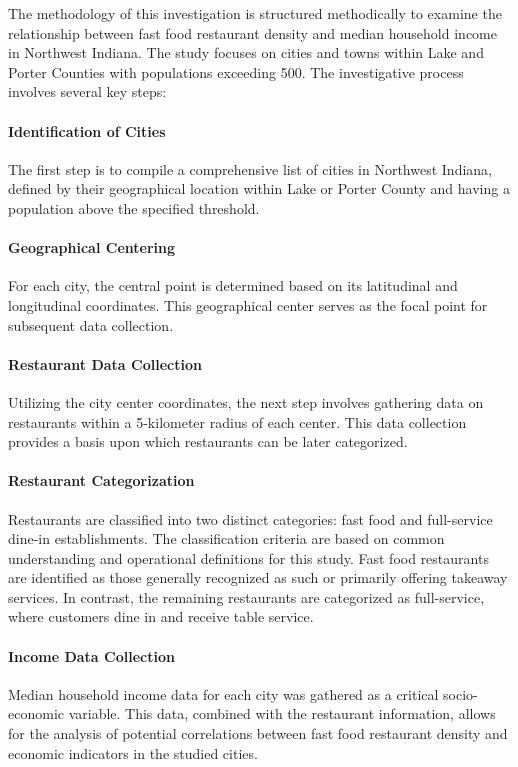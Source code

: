 \documentclass[12pt]{article}
\begin{document}
The methodology of this investigation is structured methodically to examine the relationship between fast food restaurant density and median household income in Northwest Indiana. The study focuses on cities and towns within Lake and Porter Counties with populations exceeding 500. The investigative process involves several key steps:

\paragraph{Identification of Cities}
The first step is to compile a comprehensive list of cities in Northwest Indiana, defined by their geographical location within Lake or Porter County and having a population above the specified threshold.

\paragraph{Geographical Centering}
For each city, the central point is determined based on its latitudinal and longitudinal coordinates. This geographical center serves as the focal point for subsequent data collection.

\paragraph{Restaurant Data Collection}
Utilizing the city center coordinates, the next step involves gathering data on restaurants within a 5-kilometer radius of each center. This data collection provides a basis upon which restaurants can be later categorized.

\paragraph{Restaurant Categorization}
Restaurants are classified into two distinct categories: fast food and full-service dine-in establishments. The classification criteria are based on common understanding and operational definitions for this study. Fast food restaurants are identified as those generally recognized as such or primarily offering takeaway services. In contrast, the remaining restaurants are categorized as full-service, where customers dine in and receive table service.

\paragraph{Income Data Collection}
Median household income data for each city was gathered as a critical socio-economic variable. This data, combined with the restaurant information, allows for the analysis of potential correlations between fast food restaurant density and economic indicators in the studied cities.
\end{document}
